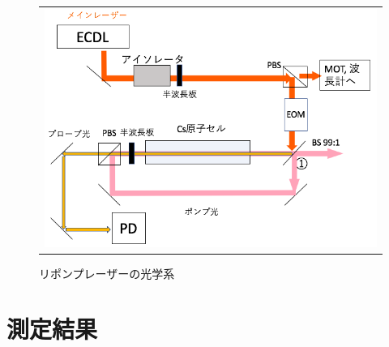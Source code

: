 \documentclass[uplatex, dvipdfmx, a4paper, report, papersize, 11pt]{jsbook}
\begin{document}
\begin{figure}
  \centering
    \begin{tabular}{c}
      \begin{minipage}{1\hsize}
        \centering
          \includegraphics[keepaspectratio,  scale=0.35,  angle=0]
                          {figures/saturated-absorption/repump_diagram.png}
                          \caption{リポンプレーザーの光学系}
                          \label{repump_diagram}
      \end{minipage}
    \end{tabular}
\end{figure}

\section{測定結果}
\end{document}
